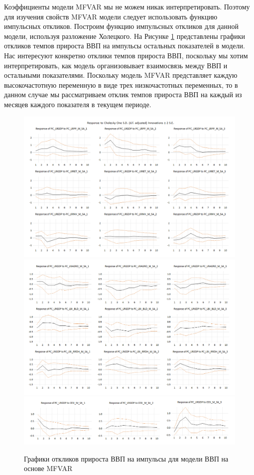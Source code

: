 \documentclass[a4paper, 14pt]{extreport}
\numberwithin{equation}{section}
\numberwithin{equation}{section}
\begin{document}
	Коэффициенты модели MFVAR мы не можем никак интерпретировать. Поэтому для изучения свойств MFVAR модели следует использовать функцию импульсных откликов. Построим функцию импульсных откликов для данной модели, используя разложение Холецкого. На Рисунке \ref{fig:image44} представлены графики откликов темпов прироста ВВП на импульсы остальных показателей в модели. Нас интересуют конкретно отклики темпов прироста ВВП, поскольку мы хотим интерпретировать, как модель организовывает взаимосвязь между ВВП и остальными показателями. Поскольку модель MFVAR представляет каждую высокочастотную переменную в виде трех низкочастотных переменных, то в данном случае мы рассматриваем отклик темпов прироста ВВП на каждый из месяцев каждого показателя в текущем периоде.
	
	\begin{figure}
		\centering
		\includegraphics[width=\textwidth]{images/image44}\\
		\includegraphics[width=\textwidth]{images/image45}\\
		\includegraphics[width=\textwidth]{images/image46}
		\caption{Графики откликов прироста ВВП на импульсы  для модели ВВП на основе MFVAR}
		\label{fig:image44}
	\end{figure}
	
\end{document}
